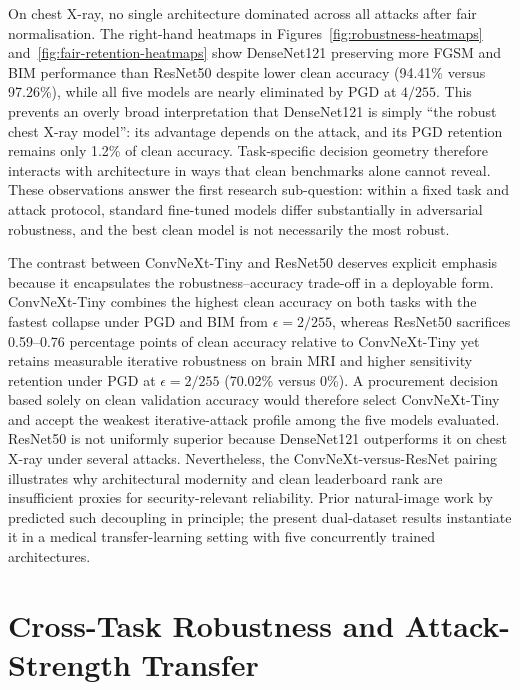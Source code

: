 \documentclass[12pt,a4paper,oneside]{report}
\begin{document}
On chest X-ray, no single architecture dominated across all attacks after fair normalisation. The right-hand heatmaps in Figures~\ref{fig:robustness-heatmaps} and~\ref{fig:fair-retention-heatmaps} show DenseNet121 preserving more FGSM and BIM performance than ResNet50 despite lower clean accuracy (94.41\% versus 97.26\%), while all five models are nearly eliminated by PGD at $4/255$. This prevents an overly broad interpretation that DenseNet121 is simply ``the robust chest X-ray model'': its advantage depends on the attack, and its PGD retention remains only 1.2\% of clean accuracy. Task-specific decision geometry therefore interacts with architecture in ways that clean benchmarks alone cannot reveal. These observations answer the first research sub-question: within a fixed task and attack protocol, standard fine-tuned models differ substantially in adversarial robustness, and the best clean model is not necessarily the most robust.

The contrast between ConvNeXt-Tiny and ResNet50 deserves explicit emphasis because it encapsulates the robustness--accuracy trade-off in a deployable form. ConvNeXt-Tiny combines the highest clean accuracy on both tasks with the fastest collapse under PGD and BIM from $\epsilon = 2/255$, whereas ResNet50 sacrifices 0.59--0.76 percentage points of clean accuracy relative to ConvNeXt-Tiny yet retains measurable iterative robustness on brain MRI and higher sensitivity retention under PGD at $\epsilon = 2/255$ (70.02\% versus 0\%). A procurement decision based solely on clean validation accuracy would therefore select ConvNeXt-Tiny and accept the weakest iterative-attack profile among the five models evaluated. ResNet50 is not uniformly superior because DenseNet121 outperforms it on chest X-ray under several attacks. Nevertheless, the ConvNeXt-versus-ResNet pairing illustrates why architectural modernity and clean leaderboard rank are insufficient proxies for security-relevant reliability. Prior natural-image work by \citet{tsipras2019robustness} predicted such decoupling in principle; the present dual-dataset results instantiate it in a medical transfer-learning setting with five concurrently trained architectures.

\section{Cross-Task Robustness and Attack-Strength Transfer}
\label{sec:disc-cross-task}

\end{document}
